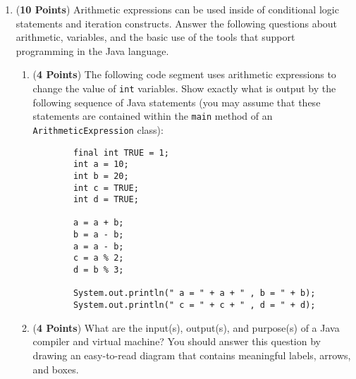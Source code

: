 \documentclass[12pt]{article}
\begin{document}
\begin{enumerate}

\item ({\bf 10 Points}) Arithmetic expressions can be used inside of conditional logic statements and iteration
  constructs.  Answer the following questions about arithmetic, variables, and the basic use of the tools that support
  programming in the Java language.

\begin{enumerate}

\item ({\bf 4 Points}) The following code segment uses arithmetic expressions to change the value of {\tt int}
  variables.  Show exactly what is output by the following sequence of Java statements (you may assume that these
  statements are contained within the {\tt main} method of an {\tt ArithmeticExpression} class):

  \begin{verbatim}
        final int TRUE = 1;
        int a = 10;
        int b = 20;
        int c = TRUE;
        int d = TRUE;
        
        a = a + b;
        b = a - b;
        a = a - b;
        c = a % 2;
        d = b % 3;
        
        System.out.println(" a = " + a + " , b = " + b);
        System.out.println(" c = " + c + " , d = " + d);
  \end{verbatim}
  \vspace*{-.2in}

\item ({\bf 4 Points}) What are the input(s), output(s), and purpose(s) of a Java compiler and virtual machine?  You
  should answer this question by drawing an easy-to-read diagram that contains meaningful labels, arrows, and boxes.




\end{enumerate}
\end{enumerate}
\end{document}
